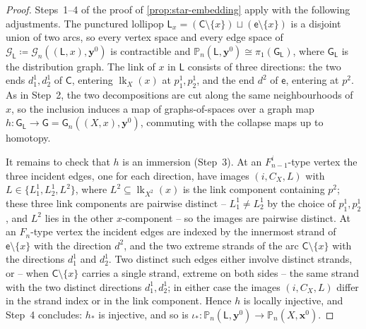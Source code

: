 \documentclass[reqno]{amsart}
\theoremstyle{definition}
\newcommand\bfx{\mathbf{x}}
\newcommand\bfy{\mathbf{y}}
\newcommand\cG{\mathcal{G}}
\newcommand\sfG{\mathsf{G}}
\newcommand{\PB}{\mathbb{P}}
\newcommand{\base}{\bfx^0}
\newcommand{\Lollipop}{\mathsf{L}}
\DeclareMathOperator{\lk}{lk}
\numberwithin{equation}{section}
\begin{document}
\begin{proof}
Steps~1--4 of the proof of \cref{prop:star-embedding} apply with
the following adjustments. The punctured lollipop
\(\Lollipop_x=(\mathsf{C}\setminus\{x\})\sqcup
(\mathsf{e}\setminus\{x\})\) is a disjoint union of two arcs, so
every vertex space and every edge space of
\(\cG_\Lollipop\coloneqq\cG_n((\Lollipop,x),\bfy^0)\) is
contractible and
\(\PB_n(\Lollipop,\bfy^0)\cong\pi_1(\sfG_\Lollipop)\), where
\(\sfG_\Lollipop\) is the distribution graph. The link of \(x\) in
\(\Lollipop\) consists of three directions: the two ends
\(d^1_1,d^1_2\) of \(\mathsf{C}\), entering \(\lk_X(x)\) at
\(p^1_1,p^1_2\), and the end \(d^2\) of \(\mathsf{e}\), entering
at \(p^2\). As in Step~2, the two decompositions are cut along the
same neighbourhoods of \(x\), so the inclusion induces a map of
graphs-of-spaces over a graph map
\(h\colon\sfG_\Lollipop\to\sfG=\sfG_n((X,x),\bfy^0)\), commuting
with the collapse maps up to homotopy.

It remains to check that \(h\) is an immersion (Step~3). At an
\(F^i_{n-1}\)-type vertex the three incident edges, one for each
direction, have images \((i,C_X,L)\) with
\(L\in\{L^1_1,L^1_2,L^2\}\), where \(L^2\subseteq\lk_{X^2}(x)\) is
the link component containing \(p^2\); these three link components
are pairwise distinct -- \(L^1_1\neq L^1_2\) by the choice of
\(p^1_1,p^1_2\), and \(L^2\) lies in the other \(x\)-component --
so the images are pairwise distinct. At an \(F_n\)-type vertex the
incident edges are indexed by the innermost strand of
\(\mathsf{e}\setminus\{x\}\) with the direction \(d^2\), and the
two extreme strands of the arc \(\mathsf{C}\setminus\{x\}\) with
the directions \(d^1_1\) and \(d^1_2\). Two distinct such edges
either involve distinct strands, or -- when
\(\mathsf{C}\setminus\{x\}\) carries a single strand, extreme on
both sides -- the same strand with the two distinct directions
\(d^1_1,d^1_2\); in either case the images \((i,C_X,L)\) differ in
the strand index or in the link component. Hence \(h\) is locally
injective, and Step~4 concludes: \(h_\ast\) is injective, and so
is \(\iota_\ast\colon\PB_n(\Lollipop,\bfy^0)\to\PB_n(X,\base)\).


\end{proof}
\end{document}
